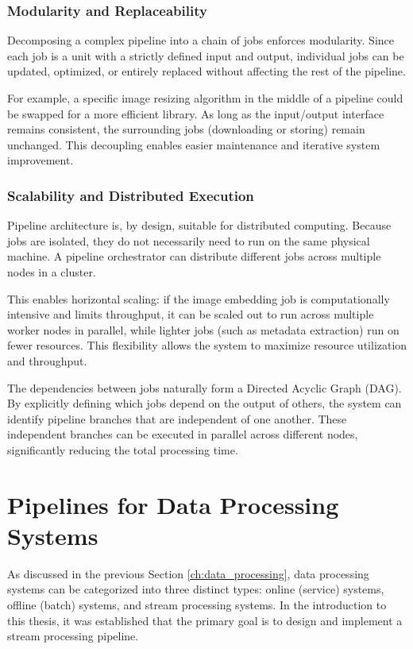 \subsubsection*{Modularity and Replaceability}
Decomposing a complex pipeline into a chain of jobs enforces modularity. Since each job is a unit with a strictly defined input and output, individual jobs can be updated, optimized, or entirely replaced without affecting the rest of the pipeline.

For example, a specific image resizing algorithm in the middle of a pipeline could be swapped for a more efficient library. As long as the input/output interface remains consistent, the surrounding jobs (downloading or storing) remain unchanged. This decoupling enables easier maintenance and iterative system improvement.

\subsubsection*{Scalability and Distributed Execution}
Pipeline architecture is, by design, suitable for distributed computing. Because jobs are isolated, they do not necessarily need to run on the same physical machine. A pipeline orchestrator can distribute different jobs across multiple nodes in a cluster.

This enables horizontal scaling: if the image embedding job is computationally intensive and limits throughput, it can be scaled out to run across multiple worker nodes in parallel, while lighter jobs (such as metadata extraction) run on fewer resources. This flexibility allows the system to maximize resource utilization and throughput.

The dependencies between jobs naturally form a Directed Acyclic Graph (DAG). By explicitly defining which jobs depend on the output of others, the system can identify pipeline branches that are independent of one another. These independent branches can be executed in parallel across different nodes, significantly reducing the total processing time. \cite{kleppmann_designing_2017}

\section{Pipelines for Data Processing Systems}\label{sec:pipeline_architectures}
As discussed in the previous Section \ref{ch:data_processing}, data processing systems can be categorized into three distinct types: online (service) systems, offline (batch) systems, and stream processing systems. In the introduction to this thesis, it was established that the primary goal is to design and implement a stream processing pipeline.


